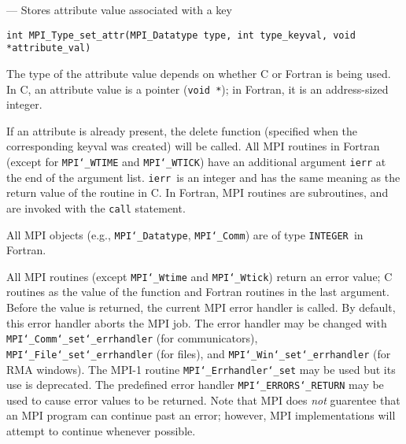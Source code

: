 \startmanpage
{}
--- Stores attribute value associated with a key 
\startvb\begin{verbatim}
int MPI_Type_set_attr(MPI_Datatype type, int type_keyval, void *attribute_val)

\end{verbatim}
\endvb

\par
{}
\par
The type of the attribute value depends on whether C or Fortran is being used.
In C, an attribute value is a pointer ({\tt void *}); in Fortran, it is an
address-sized integer.
\par
If an attribute is already present, the delete function (specified when the
corresponding keyval was created) will be called.
All MPI routines in Fortran (except for {\tt MPI{\tt \char`\_}WTIME} and {\tt MPI{\tt \char`\_}WTICK}) have
an additional argument {\tt ierr} at the end of the argument list.  {\tt ierr
}is an integer and has the same meaning as the return value of the routine
in C.  In Fortran, MPI routines are subroutines, and are invoked with the
{\tt call} statement.
\par
All MPI objects (e.g., {\tt MPI{\tt \char`\_}Datatype}, {\tt MPI{\tt \char`\_}Comm}) are of type {\tt INTEGER
}in Fortran.
\par
{}
\par
All MPI routines (except {\tt MPI{\tt \char`\_}Wtime} and {\tt MPI{\tt \char`\_}Wtick}) return an error value;
C routines as the value of the function and Fortran routines in the last
argument.  Before the value is returned, the current MPI error handler is
called.  By default, this error handler aborts the MPI job.  The error handler
may be changed with {\tt MPI{\tt \char`\_}Comm{\tt \char`\_}set{\tt \char`\_}errhandler} (for communicators),
{\tt MPI{\tt \char`\_}File{\tt \char`\_}set{\tt \char`\_}errhandler} (for files), and {\tt MPI{\tt \char`\_}Win{\tt \char`\_}set{\tt \char`\_}errhandler} (for
RMA windows).  The MPI-1 routine {\tt MPI{\tt \char`\_}Errhandler{\tt \char`\_}set} may be used but
its use is deprecated.  The predefined error handler
{\tt MPI{\tt \char`\_}ERRORS{\tt \char`\_}RETURN} may be used to cause error values to be returned.
Note that MPI does {\em not} guarentee that an MPI program can continue past
an error; however, MPI implementations will attempt to continue whenever
possible.
\par
{}
\endmanpage

